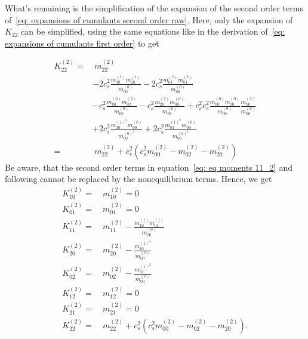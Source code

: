 What's remaining is the simplification of the expansion of the second order terms of~\eqref{eq: expansions of cumulants second order raw}.
Here, only the expansion of $K_{22}$ can be simplified, using the same equations like in the derivation of~\eqref{eq: expansions of cumulants first order} to get

\begin{equation}
  \begin{aligned}
    K_{22}^{(2)}
    = &\
    m_{22}^{(2)}
    \\&
    - 2 c_s^2 \frac{ m_{10}^{(1)} m_{10}^{(1)} }{m_{00}^{(0)}}
    - 2 c_s^2 \frac{ m_{01}^{(1)} m_{01}^{(1)} }{m_{00}^{(0)}}
    \\&
    - c_s^2\frac{  m_{00}^{(0)} m_{02}^{(2)} }{m_{00}^{(0)}}
    - c_s^2\frac{  m_{20}^{(2)} m_{00}^{(0)} }{m_{00}^{(0)}}
    + c_s^2 c_s^2 \frac{ m_{00}^{(0)} m_{00}^{(0)} }{m_{00}^{(0)}}\frac{ m_{00}^{(2)} }{m_{00}^{(0)}}
    \\&
    + 2 c_s^2 \frac{ m_{10}^{{(1)}^2} m_{00}^{(0)} }{m_{00}^{{(0)}^2}}
    + 2 c_s^2 \frac{ m_{01}^{{(1)}^2} m_{00}^{(0)} }{m_{00}^{{(0)}^2}}
    \\= &\
    m_{22}^{(2)}
    + c_s^2\left(c_s^2 m_{00}^{(2)}
    - m_{02}^{(2)}
    - m_{20}^{(2)}
    \right)
  \end{aligned}
\end{equation}
Be aware, that the second order terms in equation~\eqref{eq: eq moments 11_2} and following cannot be replaced by the nonequilibrium terms.
Hence, we get
\begin{equation}
  \label{eq: expansions of cumulants second order}
  \begin{aligned}
    K_{10}^{(2)} =&\ m_{10}^{(2)} = 0\\
    K_{01}^{(2)} =&\ m_{01}^{(2)} = 0\\
    K_{11}^{(2)} =&\ m_{11}^{(2)} - \frac{ m_{10}^{(1)}m_{01}^{(1)}}{m_{00}^{(0)}} \\
    K_{20}^{(2)} =&\ m_{20}^{(2)} - \frac{ m_{10}^{{(1)}^2}}{m_{00}^{(0)}} \\
    K_{02}^{(2)} =&\ m_{02}^{(2)} - \frac{ m_{01}^{{(1)}^2}}{m_{00}^{(0)}} \\
    K_{12}^{(2)} =&\ m_{12}^{(2)} = 0\\
    K_{21}^{(2)} =&\ m_{21}^{(2)} = 0\\
    K_{22}^{(2)} =&\
    m_{22}^{(2)}
    + c_s^2\left(c_s^2 m_{00}^{(2)}
    - m_{02}^{(2)}
    - m_{20}^{(2)}
    \right).
  \end{aligned}
\end{equation}
